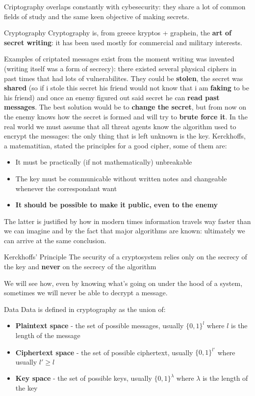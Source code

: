 Criptography overlaps constantly with cybesecurity: they share a lot of
common fields of study and the same keen objective of making secrets.
\begin{key}{Cryptography}
    Cryptography is, from greece kryptos + graphein, the \textbf{art of secret
    writing}: it has been used mostly for commercial and military interests.
\end{key}
Examples of criptated messages exist from the moment writing was invented
(writing itself was a form of secrecy): there existed several physical
ciphers in past times that had lots of vulnerabilites. They could be
\textbf{stolen}, the secret was \textbf{shared} (so if i stole this secret
his friend would not know that i am \textbf{faking} to be his friend) and
once an enemy figured out said secret he can \textbf{read past messages}.
The best solution would be to \textbf{change the secret}, but from now on
the enemy knows how the secret is formed and will try to \textbf{brute 
force it}. 
In the real world we must assume that all threat agents know the algorithm used
to encrypt the messages: the only thing that is left unknown is the key.
Kerckhoffs, a matematitian, stated the principles for a good cipher, some
of them are:
\begin{itemize}
    \item It must be practically (if not mathematically) unbreakable
    \item The key must be communicable without written notes and changeable
    whenever the correspondant want
    \item \textbf{It should be possible to make it public, even to the enemy}
\end{itemize}

The latter is justified by how in modern times information travels way faster 
than we can imagine and by the fact that major algorithms are known: ultimately
we can arrive at the same conclusion.
\begin{key}{Kerckhoffs' Principle}
    The security of a cryptosystem relies only on the secrecy of the key and
    \textbf{never} on the secrecy of the algorithm
\end{key}
We will see how, even by knowing what's going on under the hood of a system,
sometimes we will never be able to decrypt a message.

\begin{key}{Data}
    Data is defined in cryptography as the union of:
    \begin{itemize}
        \item \textbf{Plaintext space} - the set of possible messages, usually
        $\{ 0,1\}^l$ where $l$ is the length of the message
        \item \textbf{Ciphertext space} - the set of possible ciphertext, 
        usually $\{ 0,1\} ^{l'}$ where usually $l' \ge l$
        \item \textbf{Key space} - the set of possible keys, usually 
        $\{ 0,1\}^\lambda$ where $\lambda$ is the length of the key
    \end{itemize}
\end{key}


